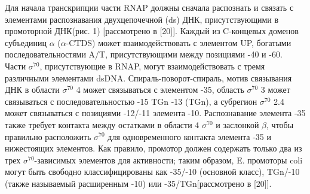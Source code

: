 \documentclass[a4paper,12pt]{article}
\begin{document}
        \par{Для начала транскрипции части RNAP должны сначала распознать и связать с элементами распознавания двухцепочечной
        (ds) ДНК, присутствующими в промоторной ДНК(рис. 1) [рассмотрено в [20]]. Каждый из C-концевых доменов субъединиц
        \(\alpha\) (\(\alpha\)-CTDS) может взаимодействовать с элементом UP, богатыми последовательностями A/T,
        присутствующими между позициями -40 и -60. Части \(\sigma^{70}\), присутствующие в RNAP, могут взаимодействовать с
        тремя различными элементами dsDNA. Спираль-поворот-спираль, мотив связывания ДНК в области \(\sigma^{70}\) 4 может
        связываться с элементом -35, область \(\sigma^{70}\) 3 может связываться с последовательностью -15 TGn -13 (TGn), а
        субрегион \(\sigma^{70}\) 2.4 может связываться с позициями -12/-11 элемента -10. Распознавание элемента -35 также
        требует контакта между остатками в области 4 \(\sigma^{70}\) и заслонкой \(\beta\), чтобы правильно расположить
        \(\sigma^{70}\) для одновременного контакта элемента -35 и нижестоящих элементов. Как правило, промотор должен
        содержать только два из трех \(\sigma^{70}\)-зависимых элементов для активности; таким образом, E. промоторы coli
        могут быть свободно классифицированы как -35/-10 (основной класс), TGn/-10 (также называемый расширенным -10) или
        -35/TGn[рассмотрено в [20]].}
\end{document}
